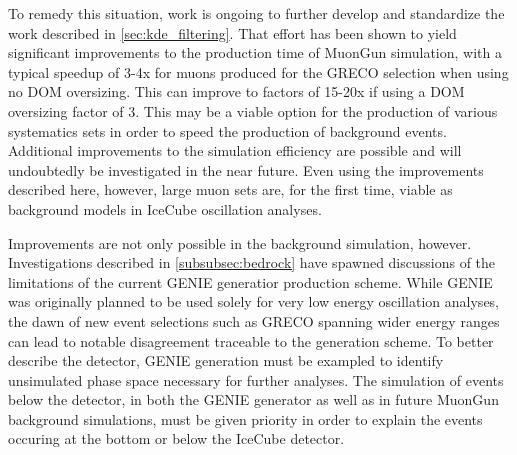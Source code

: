To remedy this situation, work is ongoing to further develop and standardize the work described in \ref{sec:kde_filtering}. 
That effort has been shown to yield significant improvements to the production time of MuonGun simulation, with a typical speedup of 3-4x for muons produced for the GRECO selection when using no DOM oversizing.
This can improve to factors of 15-20x if using a DOM oversizing factor of 3.
This may be a viable option for the production of various systematics sets in order to speed the production of background events.
Additional improvements to the simulation efficiency are possible and will undoubtedly be investigated in the near future.
Even using the improvements described here, however, large muon sets are, for the first time, viable as background models in IceCube oscillation analyses.

Improvements are not only possible in the background simulation, however.
Investigations described in \ref{subsubsec:bedrock} have spawned discussions of the limitations of the current GENIE generatior production scheme.
While GENIE was originally planned to be used solely for very low energy oscillation analyses, the dawn of new event selections such as GRECO spanning wider energy ranges can lead to notable disagreement traceable to the generation scheme.
To better describe the detector, GENIE generation must be exampled to identify unsimulated phase space necessary for further analyses.
The simulation of events below the detector, in both the GENIE generator as well as in future MuonGun background simulations, must be given priority in order to explain the events occuring at the bottom or below the IceCube detector.



